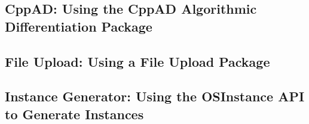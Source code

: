 \documentclass[12pt]{article}
\renewcommand{\_}{{\char"5F}}
\renewcommand{\{}{{\char"7B}}
\renewcommand{\}}{{\char"7D}}
\renewcommand{\^}{{\char"0D}}
\renewcommand{\'}{{\char"0D}}
\begin{document}
\subsection{CppAD:  Using the CppAD Algorithmic Differentiation Package}

\subsection{File Upload:  Using a File Upload Package}

\subsection{Instance Generator: Using the OSInstance API to Generate Instances}\label{subsection:exampleOSInstance}
\end{document}
